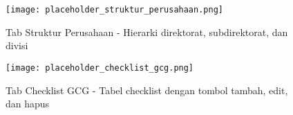 \documentclass[12pt,a4paper]{article}
\begin{document}
\begin{figure}[H]
    \centering
    \texttt{[image: placeholder\_struktur\_perusahaan.png]}
    \caption{Tab Struktur Perusahaan - Hierarki direktorat, subdirektorat, dan divisi}
    \label{fig:struktur_perusahaan}
\end{figure}

\begin{figure}[H]
    \centering
    \texttt{[image: placeholder\_checklist\_gcg.png]}
    \caption{Tab Checklist GCG - Tabel checklist dengan tombol tambah, edit, dan hapus}
    \label{fig:checklist_gcg}
\end{figure}
\end{document}
